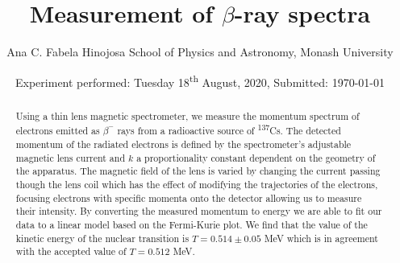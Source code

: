 \documentclass[10pt, a4paper]{article}
\title{Measurement of $\beta$-ray spectra}
\author{Ana C. Fabela Hinojosa
\small{School of Physics and Astronomy, Monash University}}
\date{Experiment performed: Tuesday 18\textsuperscript{th} August, 2020,  Submitted: \today}
\begin{document}
\maketitle
\begin{abstract}
Using a thin lens magnetic spectrometer, we measure the momentum spectrum of electrons emitted as $\beta^{-}$ rays from a radioactive source of \textsuperscript{137}Cs. 
The detected momentum of the radiated electrons is defined by the spectrometer's adjustable magnetic lens current and $k$ a proportionality constant dependent on the geometry of the apparatus. The magnetic field of the lens is varied by changing the current passing though the lens coil which has the effect of modifying the trajectories of the electrons, focusing electrons with specific momenta onto the detector allowing us to measure their intensity. By converting the measured momentum to energy we are able to fit our data to a linear model based on the Fermi-Kurie plot. We find that the value of the kinetic energy of the nuclear transition is $T = 0.514 \pm 0.05$ MeV which is in agreement with the accepted value of $T = 0.512$ MeV\cite{SPA}.
\end{abstract}
\end{document}
